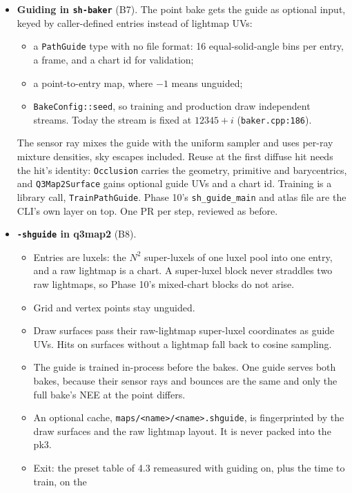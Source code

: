 \documentclass[11pt,a4paper]{article}
\begin{document}
\begin{itemize}
\item \textbf{Guiding in \texttt{sh-baker}} (B7). The point bake gets the guide as optional input,
  keyed by caller-defined entries instead of lightmap UVs:
  \begin{itemize}
  \item a \texttt{PathGuide} type with no file format: 16 equal-solid-angle bins per entry, a frame,
    and a chart id for validation;
  \item a point-to-entry map, where $-1$ means unguided;
  \item \texttt{BakeConfig::seed}, so training and production draw independent streams. Today the
    stream is fixed at $12345+i$ (\texttt{baker.cpp:186}).
  \end{itemize}
  The sensor ray mixes the guide with the uniform sampler and uses per-ray mixture densities,
  sky escapes included. Reuse at the first diffuse hit needs the hit's identity: \texttt{Occlusion}
  carries the geometry, primitive and barycentrics, and \texttt{Q3Map2Surface} gains optional guide
  UVs and a chart id. Training is a library call, \texttt{TrainPathGuide}. Phase 10's
  \texttt{sh\_guide\_main} and atlas file are the CLI's own layer on top. One PR per step, reviewed
  as before.
\item \textbf{\texttt{-shguide} in q3map2} (B8).
  \begin{itemize}
  \item Entries are luxels: the $N^2$ super-luxels of one luxel pool into one entry, and a raw
    lightmap is a chart. A super-luxel block never straddles two raw lightmaps, so Phase 10's
    mixed-chart blocks do not arise.
  \item Grid and vertex points stay unguided.
  \item Draw surfaces pass their raw-lightmap super-luxel coordinates as guide UVs. Hits on surfaces
    without a lightmap fall back to cosine sampling.
  \item The guide is trained in-process before the bakes. One guide serves both bakes, because their
    sensor rays and bounces are the same and only the full bake's NEE at the point differs.
  \item An optional cache, \texttt{maps/<name>/<name>.shguide}, is fingerprinted by the draw
    surfaces and the raw lightmap layout. It is never packed into the pk3.
  \item Exit: the preset table of 4.3 remeasured with guiding on, plus the time to train, on the

\end{itemize}
\end{itemize}
\end{document}
